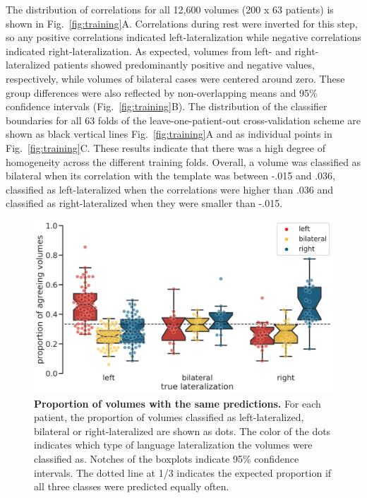 \documentclass[fleqn,10pt]{SelfArx} %
\begin{document}
The distribution of correlations for all 12,600 volumes (200 x 63 patients) is shown in Fig.~\ref{fig:training}A. Correlations during rest were inverted for this step, so any positive correlations indicated left-lateralization while negative correlations indicated right-lateralization. As expected, volumes from left- and right-lateralized patients showed predominantly positive and negative values, respectively, while volumes of bilateral cases were centered around zero. These group differences were also reflected by non-overlapping means and 95\% confidence intervals (Fig.~\ref{fig:training}B). The distribution of the classifier boundaries for all 63 folds of the leave-one-patient-out cross-validation scheme are shown as black vertical lines Fig.~\ref{fig:training}A and as individual points in Fig.~\ref{fig:training}C. These results indicate that there was a high degree of homogeneity across the different training folds. Overall, a volume was classified as bilateral when its correlation with the template was between -.015 and .036, classified as left-lateralized when the correlations were higher than .036 and classified as right-lateralized when they were smaller than -.015.

\begin{figure}[htb]
	\begin{minipage}{\textwidth}
		\renewcommand{\familydefault}{\sfdefault}\normalfont
		\centering
		\includegraphics[width=0.75\columnwidth]{../reports/figures/13-swarmplot-descriptive.png}
		\caption{\textbf{Proportion of volumes with the same predictions.} 
			For each patient, the proportion of volumes classified as left-lateralized, bilateral or right-lateralized are shown as dots. The color of the dots indicates which type of language lateralization the volumes were classified as. Notches of the boxplots indicate 95\% confidence intervals. The dotted line at 1/3 indicates the expected proportion if all three classes were predicted equally often.}%
		\label{fig:swarm}
	\end{minipage}
\end{figure}
\end{document}
